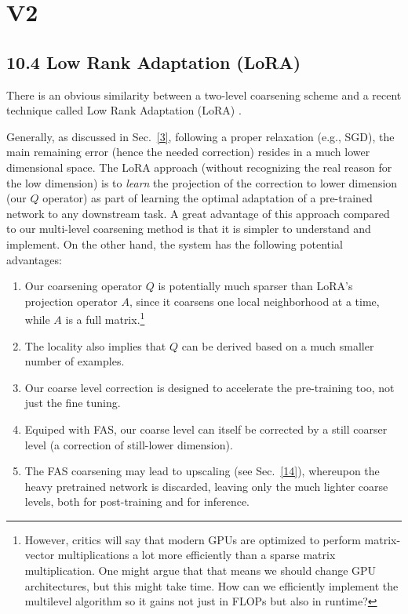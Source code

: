 \documentclass{article} %
\begin{document}
\section{V2}
\subsection{10.4 Low Rank Adaptation (LoRA)}
There is an obvious similarity between a two-level coarsening scheme and a recent technique called Low Rank Adaptation (LoRA) \cite{lora}.

Generally, as discussed in Sec.~\ref{3}, following a proper relaxation (e.g., SGD), the main remaining error (hence the needed correction) resides in a much lower dimensional space. The LoRA approach (without recognizing the real reason for the low dimension) is to {\it learn} the projection of the correction to lower dimension (our $Q$ operator) as part of learning the optimal adaptation of a pre-trained network to any downstream task. A great advantage of this approach compared to our multi-level coarsening method is that it is simpler to understand and implement. On the other hand, the system has the following potential advantages:

\begin{enumerate}
    \item Our coarsening operator $Q$ is potentially much sparser than LoRA's projection operator $A$, since it coarsens one local neighborhood at a time, while $A$ is a full matrix.\footnote{However, critics will say that modern GPUs are optimized to perform matrix-vector multiplications a lot more efficiently than a sparse matrix multiplication. One might argue that that means we should change GPU architectures, but this might take time. How can we efficiently implement the multilevel algorithm so it gains not just in FLOPs but also in runtime?}
    \item The locality also implies that $Q$ can be derived based on a much smaller number of examples.
    \item Our coarse level correction is designed to accelerate the pre-training too, not just the fine tuning.
    \item Equiped with FAS, our coarse level can itself be corrected by a still coarser level (a correction of still-lower dimension).
    \item The FAS coarsening may lead to upscaling (see Sec.~\ref{14}), whereupon the heavy pretrained network is discarded, leaving only the much lighter coarse levels, both for post-training and for inference.
\end{enumerate}
\end{document}

